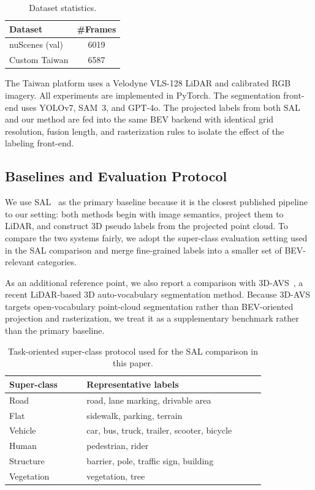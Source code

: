 \documentclass[conference]{IEEEtran}
\begin{document}
\begin{table}[t]
  \caption{Dataset statistics.}
  \label{tab:dataset-frames}
  \centering
  \begin{tabular}{lc}
    \toprule
    Dataset & \#Frames \\
    \midrule
    nuScenes (val) & 6019 \\
    Custom Taiwan & 6587 \\
    \bottomrule
  \end{tabular}
\end{table}

The Taiwan platform uses a Velodyne VLS-128 LiDAR and calibrated RGB imagery. All experiments are implemented in PyTorch. The segmentation front-end uses YOLOv7, SAM~3, and GPT-4o. The projected labels from both SAL and our method are fed into the same BEV backend with identical grid resolution, fusion length, and rasterization rules to isolate the effect of the labeling front-end.

\subsection{Baselines and Evaluation Protocol}
We use SAL~\cite{sal} as the primary baseline because it is the closest published pipeline to our setting: both methods begin with image semantics, project them to LiDAR, and construct 3D pseudo labels from the projected point cloud. To compare the two systems fairly, we adopt the super-class evaluation setting used in the SAL comparison and merge fine-grained labels into a smaller set of BEV-relevant categories.

As an additional reference point, we also report a comparison with 3D-AVS~\cite{three_d_avs}, a recent LiDAR-based 3D auto-vocabulary segmentation method. Because 3D-AVS targets open-vocabulary point-cloud segmentation rather than BEV-oriented projection and rasterization, we treat it as a supplementary benchmark rather than the primary baseline.

\begin{table}[t]
  \caption{Task-oriented super-class protocol used for the SAL comparison in this paper.}
  \label{tab:label-protocol}
  \centering
  \footnotesize
  \begin{tabular}{p{0.26\linewidth}p{0.60\linewidth}}
    \toprule
    Super-class & Representative labels \\
    \midrule
    Road & road, lane marking, drivable area \\
    Flat & sidewalk, parking, terrain \\
    Vehicle & car, bus, truck, trailer, scooter, bicycle \\
    Human & pedestrian, rider \\
    Structure & barrier, pole, traffic sign, building \\
    Vegetation & vegetation, tree \\
    \bottomrule
  \end{tabular}
\end{table}
\end{document}
